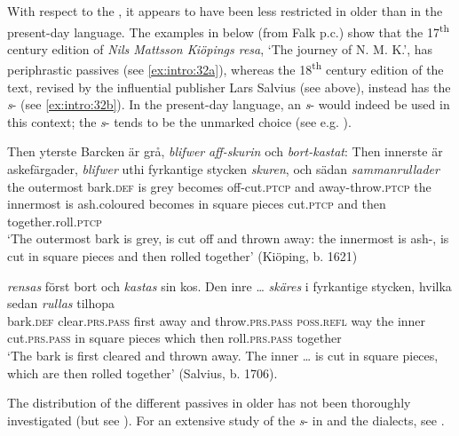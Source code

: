 \documentclass[output=paper]{langscibook}
\begin{document}
With respect to the , it appears to have been less restricted in older  than in the present-day language. The examples in  below (from Falk p.c.) show that the 17\textsuperscript{th} century edition of \textit{Nils Mattsson Kiöpings resa}, ‘The journey of N. M. K.’, has periphrastic passives (see \ref{ex:intro:32a}), whereas the 18\textsuperscript{th} century edition of the text, revised by the influential publisher Lars Salvius (see  above), instead has the \textit{s}{}- (see \ref{ex:intro:32b}). In the present-day language, an \textit{s}{}- would indeed be used in this context; the \textit{s}{}- tends to be the unmarked choice (see e.g. \citealt{Engdahl2006}).


\ea\label{ex:intro:32}
\ea \label{ex:intro:32a}
\gll  Then   yterste     Barcken   är grå, \textit{blifwer}     \textit{aff-skurin} och \textit{bort-kastat}: Then innerste     är askefärgader, \textit{blifwer} uthi   fyrkantige   stycken \textit{skuren},   och   sädan \textit{sammanrullader}\\
the   outermost bark\textsc{.def}  is  grey becomes  off-cut\textsc{.ptcp}  and   away\textsc{{}-}throw.\textsc{ptcp} the     innermost   is ash.coloured   becomes  in    square     pieces cut\textsc{.ptcp} and   then     together.roll\textsc{.ptcp}\\
\glt  ‘The outermost bark is grey, is cut off and thrown away: the innermost is ash-, is cut in square pieces and then rolled together’ (Kiöping, b. 1621)

\ex \label{ex:intro:32b}
\gll  [barken] \textit{rensas} först bort och \textit{kastas} sin       kos. Den inre … \textit{skäres} i   fyrkantige   stycken,   hvilka sedan \textit{rullas} tilhopa\\
    bark.\textsc{def} clear.\textsc{prs.pass}   first away and throw.\textsc{prs.pass}   \textsc{poss.refl}   way the   inner {} cut.\textsc{prs.pass} in   square     pieces   which then     roll\textsc{.prs.pass} together\\

\glt `The bark is first cleared and thrown away. The inner … is cut in square pieces, which are then rolled together’ (Salvius, b. 1706).
\z
\z

The distribution of the different passives in older  has not been thoroughly investigated (but see \citealt{Kirri1975}). For an extensive study of the \textit{s}{}- in  and the  dialects, see \citet{Holm1952}.
\end{document}
